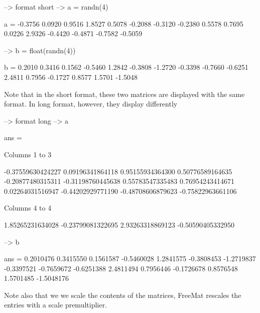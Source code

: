 \begin{DoxyVerbInclude}
--> format short
--> a = randn(4)

a = 
   -0.3756    0.0920    0.9516    1.8527 
    0.5078   -0.2088   -0.3120   -0.2380 
    0.5578    0.7695    0.0226    2.9326 
   -0.4420   -0.4871   -0.7582   -0.5059 

--> b = float(randn(4))

b = 
    0.2010    0.3416    0.1562   -0.5460 
    1.2842   -0.3808   -1.2720   -0.3398 
   -0.7660   -0.6251    2.4811    0.7956 
   -0.1727    0.8577    1.5701   -1.5048 
\end{DoxyVerbInclude}


Note that in the short format, these two matrices are displayed with the same format. In {\ttfamily long} format, however, they display differently


\begin{DoxyVerbInclude}
--> format long
--> a

ans = 

 Columns 1 to 3

  -0.37559630424227   0.09196341864118   0.95155934364300 
   0.50776589164635  -0.20877480315311  -0.31198760445638 
   0.55783547335483   0.76954243414671   0.02264031516947 
  -0.44202929771190  -0.48708606879623  -0.75822963661106 

 Columns 4 to 4

   1.85265231634028 
  -0.23799081322695 
   2.93263318869123 
  -0.50590405332950 

--> b

ans = 
   0.2010476   0.3415550   0.1561587  -0.5460028 
   1.2841575  -0.3808453  -1.2719837  -0.3397521 
  -0.7659672  -0.6251388   2.4811494   0.7956446 
  -0.1726678   0.8576548   1.5701485  -1.5048176 
\end{DoxyVerbInclude}


Note also that we we scale the contents of the matrices, Free\-Mat rescales the entries with a scale premultiplier.


